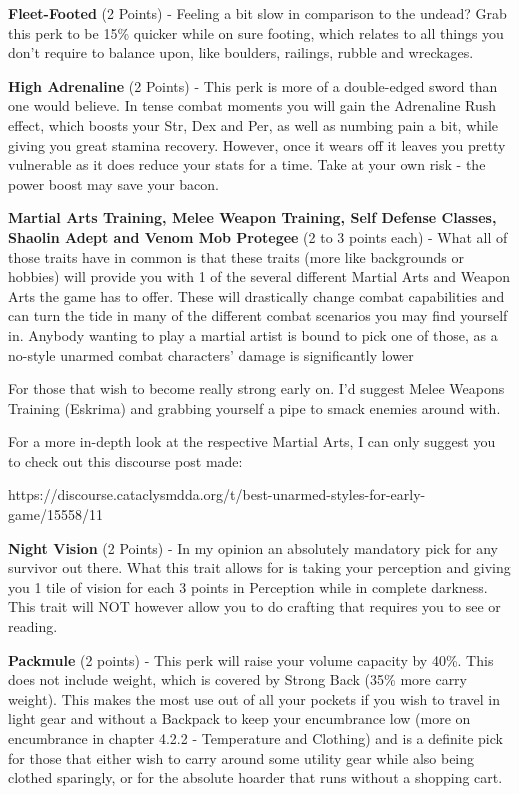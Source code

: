 \documentclass[11pt]{report}
\begin{document}
\textbf{Fleet-Footed} (2 Points) - Feeling a bit slow in comparison to the undead? Grab this perk to be 15\% quicker while on sure footing, which relates to all things you don't require to balance upon, like boulders, railings, rubble and wreckages.

\textbf{High Adrenaline} (2 Points) - This perk is more of a double-edged sword than one would believe. In tense combat moments you will gain the Adrenaline Rush effect, which boosts your Str, Dex and Per, as well as numbing pain a bit, while giving you great stamina recovery. However, once it wears off it leaves you pretty vulnerable as it does reduce your stats for a time. Take at your own risk - the power boost may save your bacon.

\textbf{Martial Arts Training, Melee Weapon Training, Self Defense Classes, Shaolin Adept and Venom Mob Protegee} (2 to 3 points each) - What all of those traits have in common is that these traits (more like backgrounds or hobbies) will provide you with 1 of the several different Martial Arts and Weapon Arts the game has to offer. These will drastically change combat capabilities and can turn the tide in many of the different combat scenarios you may find yourself in. Anybody wanting to play a martial artist is bound to pick one of those, as a no-style unarmed combat characters' damage is significantly lower

For those that wish to become really strong early on. I'd suggest Melee Weapons Training (Eskrima) and grabbing yourself a pipe to smack enemies around with.

For a more in-depth look at the respective Martial Arts, I can only suggest you to check out this discourse post made:

https://discourse.cataclysmdda.org/t/best-unarmed-styles-for-early-game/15558/11

\textbf{Night Vision} (2 Points) - In my opinion an absolutely mandatory pick for any survivor out there. What this trait allows for is taking your perception and giving you 1 tile of vision for each 3 points in Perception while in complete darkness. This trait will NOT however allow you to do crafting that requires you to see or reading.

\textbf{Packmule} (2 points) - This perk will raise your volume capacity by 40\%. This does not include weight, which is covered by Strong Back (35\% more carry weight). This makes the most use out of all your pockets if you wish to travel in light gear and without a Backpack to keep your encumbrance low (more on encumbrance in chapter 4.2.2 - Temperature and Clothing) and is a definite pick for those that either wish to carry around some utility gear while also being clothed sparingly, or for the absolute hoarder that runs without a shopping cart.
\end{document}
